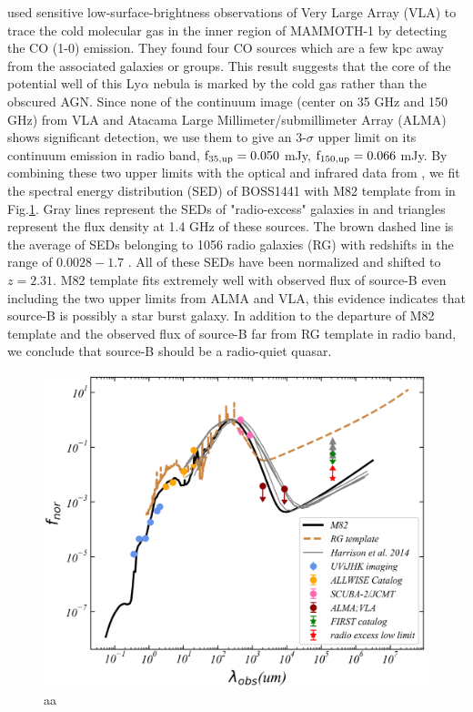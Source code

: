 \documentclass[../Results.tex]{subfiles}
\begin{document}
	\cite{emonts2019cold} used sensitive low-surface-brightness observations of Very Large Array (VLA) to trace the cold molecular gas in the inner region of MAMMOTH-1 by detecting the CO (1-0) emission. They found four CO sources which are a few kpc away from the associated galaxies or groups. This result suggests that the core of the potential well of this Ly$\alpha$ nebula is marked by the cold gas rather than the obscured AGN. Since none of the continuum image (center on 35 GHz and 150 GHz) from VLA and Atacama Large Millimeter/submillimeter Array (ALMA) shows significant detection, we use them to give an 3-$\sigma$ upper limit on its continuum emission in radio band, $\rm f_{35,up}=0.050$ mJy, $\rm f_{150,up}=0.066$ mJy. By combining these two upper limits with the optical and infrared data from \citet{arrigoni2018overdensity}, we fit the spectral energy distribution (SED) of BOSS1441 with M82 template from \cite{Silva_1998} in Fig.\ref{SED}. Gray lines represent the SEDs of "radio-excess" galaxies in \citet{harrison2014kiloparsec} and triangles represent the flux density at 1.4 GHz of these sources. The brown dashed line is the average of SEDs belonging to 1056 radio galaxies (RG) with redshifts in the range of $0.0028-1.7$ \citep{Toba_2019}. All of these SEDs have been normalized and shifted to $z=2.31$. M82 template fits extremely well with observed flux of source-B even including the two upper limits from ALMA and VLA, this evidence indicates that source-B is possibly a star burst galaxy. In addition to the departure of M82 template and the observed flux of source-B far from RG template in radio band, we conclude that source-B should be a radio-quiet quasar.
	
	\begin{figure}[htp]
		\centering
		\includegraphics[width=\columnwidth]{figs/SED_fitting}
		\caption{aa}
		\label{SED}
	\end{figure}
	
\end{document}
